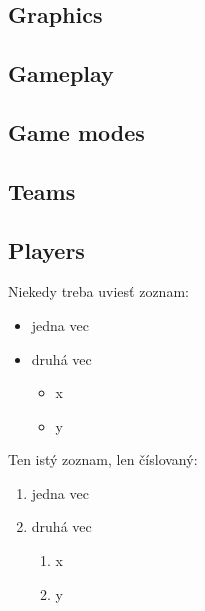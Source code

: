 \documentclass[12pt,twoside,english,a4paper]{article}
\begin{document}
\subsection{Graphics} \label{aspects: graphics}

\subsection{Gameplay} \label{aspects: gameplay}

\subsection{Game modes} \label{aspects: modes}

\subsection{Teams} \label{aspects: teams}

\subsection{Players} \label{aspects: players}

Niekedy treba uviesť zoznam:

\begin{itemize}
\item jedna vec
\item druhá vec
	\begin{itemize}
	\item x
	\item y
	\end{itemize}
\end{itemize}

Ten istý zoznam, len číslovaný:

\begin{enumerate}
\item jedna vec
\item druhá vec
	\begin{enumerate}
	\item x
	\item y
	\end{enumerate}
\end{enumerate}




\end{document}
